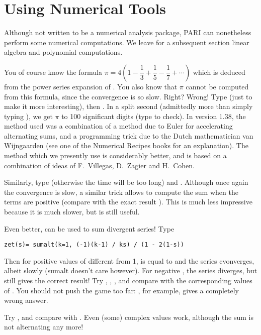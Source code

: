 \section{Using Numerical Tools}

 Although not written to be a numerical analysis package, PARI can
nonetheless perform some numerical computations. We leave for a subsequent
section linear algebra and polynomial computations.

You of course know the formula $\pi = 4(1-\dfrac13+\dfrac15-\dfrac17+\cdots)$
which is deduced from the power series expansion of . You also
know that $\pi$ cannot be computed from this formula, since the convergence
is so slow. Right? Wrong! Type  (just to make it more
interesting), then . In a split
second (admittedly more than simply typing ), we get $\pi$ to 100
significant digits (type  to check). In version 1.38, the method used
was a combination of a method due to Euler for accelerating alternating sums,
and a programming trick due to the Dutch mathematician van Wijngaarden (see
one of the Numerical Recipes books for an explanation). The method which we
presently use is considerably better, and is based on a combination of ideas of
F.~Villegas, D.~Zagier and H.~Cohen.

Similarly, type  (otherwise the time will be too long) and
. Although once again the convergence is slow, a
similar trick allows to compute the sum when the terms are positive (compare
with the exact result ). This is much less impressive because
it is much slower, but is still useful.

Even better,  can be used to sum divergent series! Type

\centerline{\tt zet(s)= sumalt(k=1, (-1)\pow(k-1) / k\pow s) / (1 - 2\pow(1-s))}

Then for positive values of  different from 1,  is equal
to  and the series cvonverges, albeit slowly (sumalt doesn't
care however). For negative , the series diverges, but 
still gives the correct result! Try , ,
, and compare with the corresponding values of .
You should not push the game too far: , for example,
gives a completely wrong answer.

Try , and compare with . Even (some) complex values
work, although the sum is not alternating any more!

